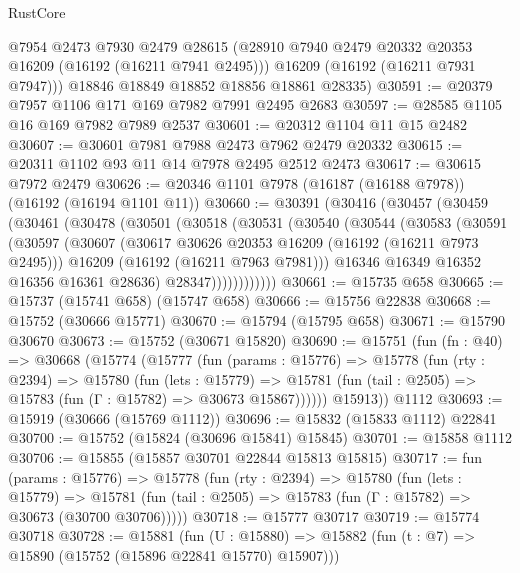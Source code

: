 \begin{lexlean}{RustCore}
\begin{coremodule}
        @7954
        @2473
        @7930
        @2479
        @28615
        (@28910 @7940 @2479 @20332 @20353 @16209 (@16192 (@16211 @7941 @2495)))
        @16209
        (@16192 (@16211 @7931 @7947)))
      @18846
      @18849
      @18852
      @18856
      @18861
      @28335)
@30591 := @20379 @7957 @1106 @171 @169 @7982 @7991 @2495 @2683
@30597 := @28585 @1105 @16 @169 @7982 @7989 @2537
@30601 := @20312 @1104 @11 @15 @2482
@30607 := @30601 @7981 @7988 @2473 @7962 @2479 @20332
@30615 := @20311 @1102 @93 @11 @14 @7978 @2495 @2512 @2473
@30617 := @30615 @7972 @2479
@30626 := @20346 @1101 @7978 (@16187 (@16188 @7978)) (@16192 (@16194 @1101 @11))
@30660 := @30391
    (@30416
      (@30457
        (@30459
          (@30461
            (@30478
              (@30501
                (@30518
                  (@30531
                    (@30540
                      (@30544
                        (@30583
                          (@30591
                            (@30597
                              (@30607
                                (@30617 @30626 @20353 @16209 (@16192 (@16211 @7973 @2495)))
                                @16209
                                (@16192 (@16211 @7963 @7981)))
                              @16346
                              @16349
                              @16352
                              @16356
                              @16361
                              @28636)
                            @28347))))))))))))
@30661 := @15735 @658
@30665 := @15737 (@15741 @658) (@15747 @658)
@30666 := @15756 @22838
@30668 := @15752 (@30666 @15771)
@30670 := @15794 (@15795 @658)
@30671 := @15790 @30670
@30673 := @15752 (@30671 @15820)
@30690 := @15751
    (fun (fn : @40) =>
    @30668
      (@15774
        (@15777
          (fun (params : @15776) =>
          @15778
            (fun (rty : @2394) =>
            @15780
              (fun (lets : @15779) =>
              @15781 (fun (tail : @2505) => @15783 (fun (Γ : @15782) => @30673 @15867))))))
        @15913))
    @1112
@30693 := @15919 (@30666 (@15769 @1112))
@30696 := @15832 (@15833 @1112) @22841
@30700 := @15752 (@15824 (@30696 @15841) @15845)
@30701 := @15858 @1112
@30706 := @15855 (@15857 @30701 @22844 @15813 @15815)
@30717 := fun (params : @15776) =>
  @15778
    (fun (rty : @2394) =>
    @15780
      (fun (lets : @15779) =>
      @15781 (fun (tail : @2505) => @15783 (fun (Γ : @15782) => @30673 (@30700 @30706)))))
@30718 := @15777 @30717
@30719 := @15774 @30718
@30728 := @15881
    (fun (U : @15880) => @15882 (fun (t : @7) => @15890 (@15752 (@15896 @22841 @15770) @15907)))

\end{coremodule}
\end{lexlean}
